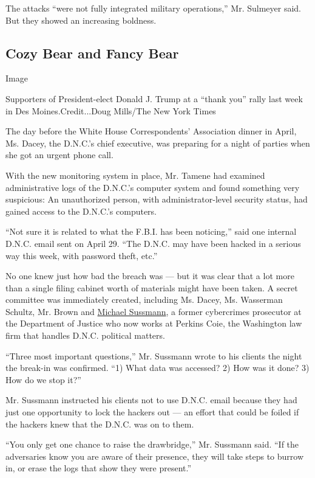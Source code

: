 The attacks ``were not fully integrated military operations,'' Mr.
Sulmeyer said. But they showed an increasing boldness.

\hypertarget{cozy-bear-and-fancy-bear}{%
\subsection{Cozy Bear and Fancy Bear}\label{cozy-bear-and-fancy-bear}}

Image

Supporters of President-elect Donald J. Trump at a ``thank you'' rally
last week in Des Moines.Credit...Doug Mills/The New York Times

The day before the White House Correspondents' Association dinner in
April, Ms. Dacey, the D.N.C.'s chief executive, was preparing for a
night of parties when she got an urgent phone call.

With the new monitoring system in place, Mr. Tamene had examined
administrative logs of the D.N.C.'s computer system and found something
very suspicious: An unauthorized person, with administrator-level
security status, had gained access to the D.N.C.'s computers.

``Not sure it is related to what the F.B.I. has been noticing,'' said
one internal D.N.C. email sent on April 29. ``The D.N.C. may have been
hacked in a serious way this week, with password theft, etc.''

No one knew just how bad the breach was --- but it was clear that a lot
more than a single filing cabinet worth of materials might have been
taken. A secret committee was immediately created, including Ms. Dacey,
Ms. Wasserman Schultz, Mr. Brown and
\href{https://www.perkinscoie.com/en/professionals/michael-sussmann.html}{Michael
Sussmann}, a former cybercrimes prosecutor at the Department of Justice
who now works at Perkins Coie, the Washington law firm that handles
D.N.C. political matters.

``Three most important questions,'' Mr. Sussmann wrote to his clients
the night the break-in was confirmed. ``1) What data was accessed? 2)
How was it done? 3) How do we stop it?''

Mr. Sussmann instructed his clients not to use D.N.C. email because they
had just one opportunity to lock the hackers out --- an effort that
could be foiled if the hackers knew that the D.N.C. was on to them.

``You only get one chance to raise the drawbridge,'' Mr. Sussmann said.
``If the adversaries know you are aware of their presence, they will
take steps to burrow in, or erase the logs that show they were
present.''

